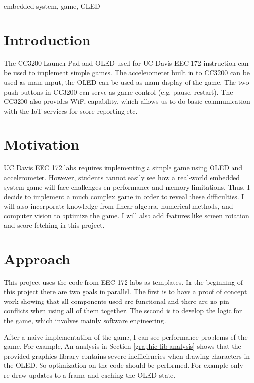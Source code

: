 \documentclass[conference]{IEEEtran}
\begin{document}
\begin{IEEEkeywords}
embedded system, game, OLED
\end{IEEEkeywords}

\section{Introduction}
The CC3200 Launch Pad and OLED used for UC Davis EEC 172 instruction can be used
 to implement simple games. The accelerometer built in to CC3200 can be used
 as main input, the OLED can be used as main display of the game. The two push
 buttons in CC3200 can serve as game control (e.g. pause, restart). The CC3200
 also provides WiFi capability, which allows us to do basic communication with
 the IoT services for score reporting etc.

\section{Motivation}
UC Davis EEC 172 labs requires implementing a simple game using OLED and
 accelerometer. However, students cannot easily see how a real-world embedded
 system game will face challenges on performance and memory limitations. Thus,
 I decide to implement a much complex game in order to reveal these
 difficulties. I will also incorporate knowledge from linear algebra, numerical
 methods, and computer vision to optimize the game. I will also add features
 like screen rotation and score fetching in this project.

\section{Approach}
This project uses the code from EEC 172 labs as templates. In the beginning of
 this project there are two goals in parallel. The first is to have a proof
 of concept work showing that all components used are functional and there are
 no pin conflicts when using all of them together. The second is to develop
 the logic for the game, which involves mainly software engineering. 

After a naive implementation of the game, I can see performance problems of the
 game. For example, An analysis in Section \ref{graphic-lib-analysis} shows that
 the provided graphics library contains severe inefficiencies when drawing
 characters in the OLED. So optimization on the code should be performed. For
 example only re-draw updates to a frame and caching the OLED state.
\end{document}
